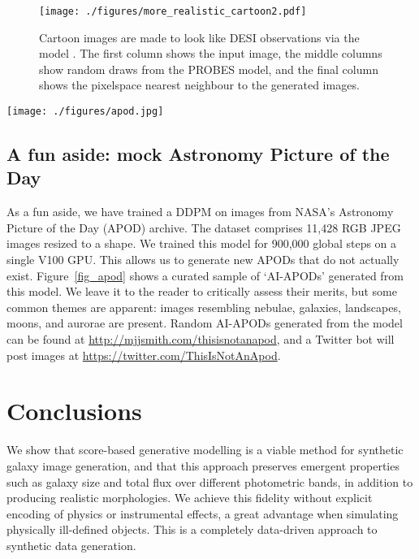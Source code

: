 \documentclass[fleqn,usenatbib]{mnras}
\begin{document}
\begin{figure}
    \centering
    \texttt{[image: ./figures/more\_realistic\_cartoon2.pdf]}
    \caption{Cartoon images are made to look like DESI observations via
    the model . 
    The first column shows the input image, the middle columns show
    random draws from the PROBES model, and the final column shows
    the pixelspace nearest neighbour to the generated images.}
    \label{fig_transfer}
\end{figure}

\begin{figure*}     
  \texttt{[image: ./figures/apod.jpg]}
\caption{A sample of DDPM-generated APOD imagery: AI-APODs. More can be found
    at \url{http://mjjsmith.com/thisisnotanapod} and you can follow a Twitter
    bot \url{https://twitter.com/ThisIsNotAnApod}. A version of this figure has
    been featured on NASA's APOD
    \url{https://apod.nasa.gov/apod/ap211109.html}.}
    \label{fig_apod}
\end{figure*}

\subsection{A fun aside: mock Astronomy Picture of the Day}

As a fun aside, we have trained a DDPM on images from NASA's Astronomy
Picture of the Day (APOD) archive. The dataset comprises 11,428 RGB JPEG
images resized to a  shape. We trained this model for 900,000
global steps on a single V100 GPU. This allows us to generate new APODs that do
not actually exist. Figure~\ref{fig_apod} shows a curated sample of `AI-APODs'
generated from this model. We leave it to the reader to critically assess their
merits, but some common themes are apparent: images resembling nebulae,
galaxies, landscapes, moons, and aurorae are present. Random AI-APODs generated
from the model can be found at \url{http://mjjsmith.com/thisisnotanapod}, and a
Twitter bot will post images at \url{https://twitter.com/ThisIsNotAnApod}.

\section{Conclusions} \label{sec_discussion}

We show that score-based generative modelling is a viable method for synthetic
galaxy image generation, and that this approach preserves emergent properties
such as galaxy size and total flux over different photometric bands, in addition
to producing realistic morphologies. We achieve this fidelity without
explicit encoding of physics or instrumental effects, a great advantage
when simulating physically ill-defined objects. This is a completely
data-driven approach to synthetic data generation.
\end{document}
